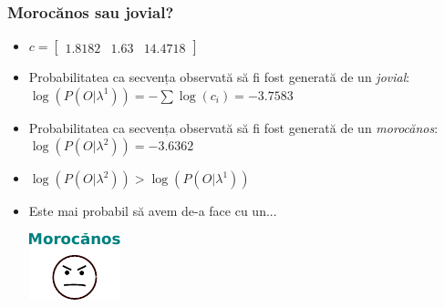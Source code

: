 \begin{frame}
  \frametitle{Morocănos sau jovial?}
  \begin{itemize}
    \item $c = \begin{bmatrix} \scriptstyle 1.8182 & \scriptstyle 1.63 &  \scriptstyle 14.4718\end{bmatrix}$
    \item Probabilitatea ca secvența observată să fi fost generată de un \emph{jovial}:\\
      $\log(P(O\vert \lambda^{1}))=-\displaystyle\sum\log(c_i) = -3.7583$\\\vspace*{1em}\pause%
    \item Probabilitatea ca secvența observată să fi fost generată de un \emph{morocănos}:\\
      $\log(P(O\vert \lambda^{2}))=-3.6362$\\\vspace*{1em}%
    \item $\log(P(O\vert \lambda^{2})) > \log(P(O\vert \lambda^{1}))$
    \item Este mai probabil să avem de-a face cu un...\pause\\\vspace*{.5em}%
      \begin{center}\includegraphics{graphics/forward-backward/guys/surly-face.pdf}\end{center}
    \end{itemize}
\end{frame}


